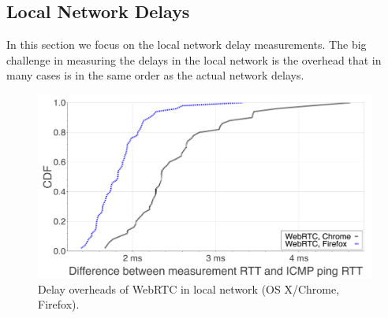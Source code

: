 \documentclass{sig-alternate-10pt}
\begin{document}
%
%

\subsection{Local Network Delays}
\label{subsec:local}

In this section we focus on the local network delay measurements. The big challenge in measuring the delays in the local network is the overhead that in many cases is in the same order as the actual network delays.

\begin{figure}[thb]
\includegraphics[width=\columnwidth]{figures/other-machine-comp-chrome-ff}
\caption{Delay overheads of WebRTC in local network (OS X/Chrome, Firefox).}
\label{fig:peer_comp_chrome_ff}
\end{figure}
\end{document}
